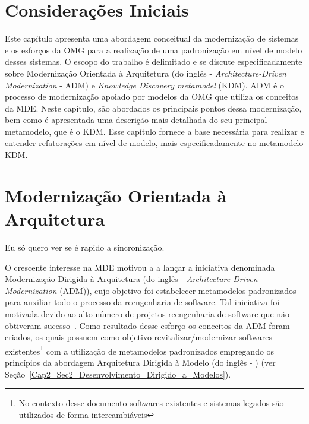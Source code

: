 
\section{Considerações Iniciais}

Este capítulo apresenta uma abordagem conceitual da modernização de sistemas e os esforços da OMG para a realização de uma padronização em nível de modelo desses sistemas. O escopo do trabalho é delimitado e se discute especificadamente sobre Modernização Orientada à Arquitetura (do inglês - \textit{Architecture-Driven Modernization} - ADM) e \textit{Knowledge Discovery metamodel} (KDM). ADM é o processo de modernização apoiado por modelos da OMG que utiliza os conceitos da MDE. Neste capítulo, são abordados os principais pontos dessa modernização, bem como é apresentada uma descrição mais detalhada do seu principal metamodelo, que é o KDM. Esse capítulo fornece a base necessária para realizar e entender refatorações em nível de modelo, mais especificadamente no metamodelo KDM.

\section{Modernização Orientada à Arquitetura} 

Eu só quero ver se é rapido a sincronização.


O crescente interesse na MDE motivou a  a lançar a iniciativa denominada Modernização Dirigida à Arquitetura (do inglês - \textit{Architecture-Driven Modernization} (ADM)), cujo objetivo foi estabelecer metamodelos padronizados para auxiliar todo o  processo da reengenharia de software. Tal iniciativa foi motivada devido ao alto número de projetos reengenharia de software que não obtiveram sucesso~\cite{Sneed_2005, Demeyer2}. Como resultado desse esforço os conceitos da ADM foram criados, os quais possuem como objetivo revitalizar/modernizar softwares existentes\footnote{No contexto desse documento softwares existentes e sistemas legados são utilizados de forma intercambiáveis} com a utilização de metamodelos padronizados empregando os princípios da abordagem Arquitetura Dirigida à Modelo (do inglês - ) (ver Seção~\ref{Cap2_Sec2_Desenvolvimento_Dirigido_a_Modelos}). %

